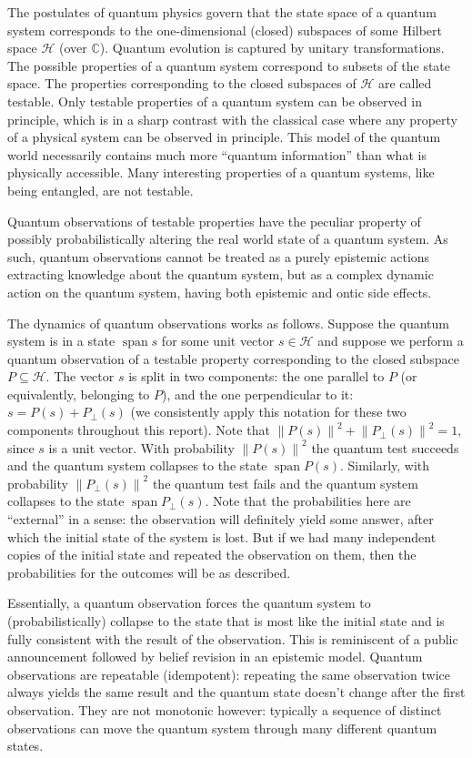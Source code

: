 \documentclass[a4paper]{article}
\newcommand{\HH}{\mathcal{H}}
\newcommand{\CC}{\mathbb{C}}
\DeclareMathOperator{\spn}{span}
\newcommand{\ppar}[1]{#1}
\newcommand{\pper}[1]{#1_{\perp}}
\newcommand{\norm}[1]{\left\lVert#1\right\rVert}
\begin{document}
The postulates of quantum physics govern that the state space of a quantum
system corresponds to the one-dimensional (closed) subspaces of some Hilbert
space $\HH$ (over $\CC$). Quantum evolution is captured by unitary
transformations. The possible properties of a quantum system correspond to
subsets of the state space. The properties corresponding to the closed subspaces
of $\HH$ are called testable. Only testable properties of a quantum system can
be observed in principle, which is in a sharp contrast with the classical case
where any property of a physical system can be observed in principle. This model
of the quantum world necessarily contains much more ``quantum information'' than
what is physically accessible. Many interesting properties of a quantum systems,
like being entangled, are not testable.

Quantum observations of testable properties have the peculiar property of
possibly probabilistically altering the real world state of a quantum system. As
such, quantum observations cannot be treated as a purely epistemic actions
extracting knowledge about the quantum system, but as a complex dynamic action
on the quantum system, having both epistemic and ontic side effects.

The dynamics of quantum observations works as follows. Suppose the quantum
system is in a state $\spn s$ for some unit vector $s \in \HH$ and suppose we
perform a quantum observation of a testable property corresponding to the closed
subspace $P \subseteq \HH$. The vector $s$ is split in two components: the one
parallel to $P$ (or equivalently, belonging to $P$), and the one perpendicular
to it: $s = \ppar{P}(s) + \pper{P}(s)$ (we consistently apply this notation for
these two components throughout this report). Note that $\norm{\ppar{P}(s)}^2 +
\norm{\pper{P}(s)}^2 = 1$, since $s$ is a unit vector. With probability
$\norm{\ppar{P}(s)}^2$ the quantum test succeeds and the quantum system
collapses to the state $\spn \ppar{P}(s)$.  Similarly, with probability
$\norm{\pper{P}(s)}^2$ the quantum test fails and the quantum system collapses
to the state $\spn \pper{P}(s)$. Note that the probabilities here are
``external'' in a sense: the observation will definitely yield some answer,
after which the initial state of the system is lost. But if we had many
independent copies of the initial state and repeated the observation on them,
then the probabilities for the outcomes will be as described.

Essentially, a quantum observation forces the quantum system to
(probabilistically) collapse to the state that is most like the initial state
and is fully consistent with the result of the observation. This is reminiscent
of a public announcement followed by belief revision in an epistemic model.
Quantum observations are repeatable (idempotent): repeating the same observation
twice always yields the same result and the quantum state doesn't change after
the first observation. They are not monotonic however: typically a sequence of
distinct observations can move the quantum system through many different quantum
states.
\end{document}
